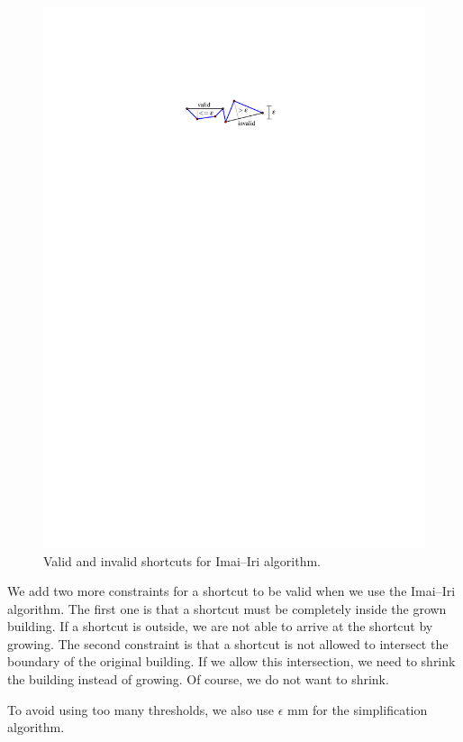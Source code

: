 \documentclass[graybox]{svmult}
\begin{document}
\begin{figure}[tb]
	\centering
	\includegraphics{ImaiIri_Shortcut}
	\caption{Valid and invalid shortcuts for Imai--Iri algorithm.}
	\label{fig:ImaiIri_Shortcut}
\end{figure}

We add two more constraints for a shortcut to be valid
when we use the Imai--Iri algorithm. 
The first one is that
a shortcut must be completely inside the grown building.
If a shortcut is outside,
we are not able to arrive at the shortcut by growing.
The second constraint is that a shortcut is not allowed to intersect the 
boundary of the original building.
If we allow this intersection, 
we need to shrink the building instead of growing. 
Of course, we do not want to shrink.

To avoid using too many thresholds, we also use $\epsilon$ mm for the 
simplification algorithm.
\end{document}
